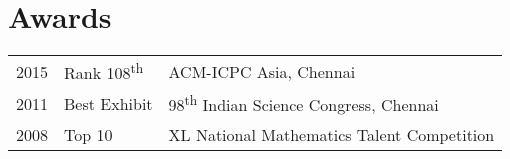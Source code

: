 \documentclass[]{deedy-resume-openfont}
\begin{document}
\begin{minipage}[t]{0.66\textwidth}


\section{Awards} 
\begin{tabular}{rll}
2015	     & Rank 108\textsuperscript{th}  & ACM-ICPC Asia, Chennai\\
2011	     & Best Exhibit  & 98\textsuperscript{th} Indian Science Congress, Chennai\\
2008     & Top 10 & XL National Mathematics Talent Competition  \\
\end{tabular}
\sectionsep


\end{minipage} 
\end{document}
